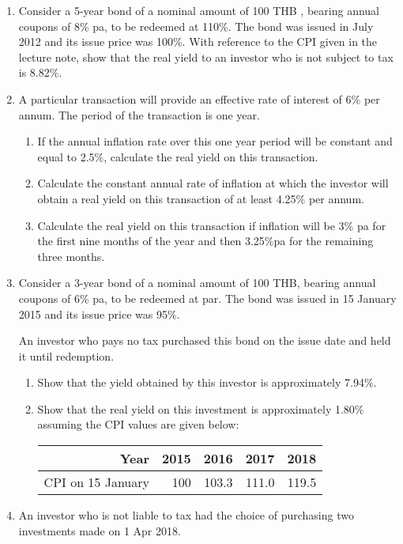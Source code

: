 \documentclass[
]{article}
\theoremstyle{definition}
\theoremstyle{definition}
\theoremstyle{definition}
\theoremstyle{definition}
\theoremstyle{remark}
\begin{document}
\begin{enumerate}
\def\labelenumi{\arabic{enumi}.}
\item
  Consider a 5-year bond of a nominal amount of 100 THB , bearing annual
  coupons of 8\% pa, to be redeemed at 110\%. The bond was issued in
  July 2012 and its issue price was 100\%. With reference to the CPI
  given in the lecture note, show that the real yield to an investor
  who is not subject to tax is 8.82\%.
\item
  A particular transaction will provide an effective rate of interest
  of 6\% per annum. The period of the transaction is one year.

  \begin{enumerate}
  \def\labelenumii{\arabic{enumii}.}
  \item
    If the annual inflation rate over this one year period will be
    constant and equal to 2.5\%, calculate the real yield on this
    transaction.
  \item
    Calculate the constant annual rate of inflation at which the
    investor will obtain a real yield on this transaction of at
    least 4.25\% per annum.
  \item
    Calculate the real yield on this transaction if inflation will
    be 3\% pa for the first nine months of the year and then 3.25\%pa
    for the remaining three months.
  \end{enumerate}
\item
  Consider a 3-year bond of a nominal amount of 100 THB, bearing annual
  coupons of 6\% pa, to be redeemed at par. The bond was issued in 15
  January 2015 and its issue price was 95\%.

  An investor who pays no tax purchased this bond on the issue date
  and held it until redemption.

  \begin{enumerate}
  \def\labelenumii{\arabic{enumii}.}
  \item
    Show that the yield obtained by this investor is approximately
    7.94\%.
  \item
    Show that the real yield on this investment is approximately
    1.80\% assuming the CPI values are given below:

    \begin{longtable}[]{@{}rrrrr@{}}
    \toprule
    Year & 2015 & 2016 & 2017 & 2018 \\
    \midrule
    \endhead
    CPI on 15 January & 100 & 103.3 & 111.0 & 119.5 \\
    \bottomrule
    \end{longtable}
  \end{enumerate}
\item
  An investor who is not liable to tax had the choice of purchasing
  two investments made on 1 Apr 2018.


\end{enumerate}
\end{document}
